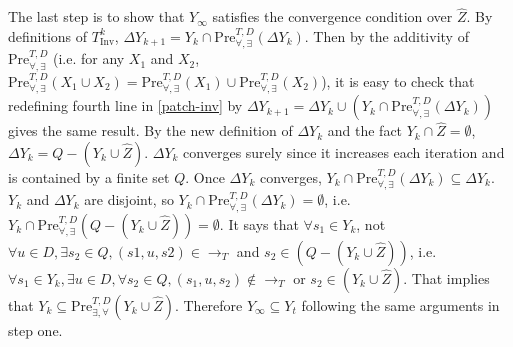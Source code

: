 	The last step is to show that $ Y_{\infty} $ satisfies the convergence condition over $ \widehat{Z} $. By definitions of $ T_{\text{Inv}}^k $, $ \Delta Y_{k+1}= Y_k \cap \text{Pre}_{\forall,\exists}^{T, D}(\Delta Y_k)$. Then by the additivity of $ \text{Pre}^{T,D}_{\forall,\exists} $ (i.e. for any $ X_1 $ and $ X_2 $, $ \text{Pre}_{\forall,\exists}^{T,D} (X_1\cup X_2)=\text{Pre}_{\forall,\exists}^{T,D} (X_1)\cup \text{Pre}_{\forall,\exists}^{T,D} (X_2) $), it is easy to check that redefining fourth line in \eqref{patch-inv} by $ \Delta Y_{k+1} = \Delta Y_k \cup (Y_k \cap \text{Pre}_{\forall,\exists}^{T, D}(\Delta Y_k)) $ gives the same result.  By the new definition of $ \Delta Y_k $ and the fact $ Y_k \cap \widehat{Z} = \emptyset $, $ \Delta Y_k = Q-(Y_k\cup \widehat{Z}) $. $ \Delta Y_k $ converges surely since it increases each iteration and is contained by a finite set $ Q $. Once $ \Delta Y_k $ converges, $ Y_k \cap \text{Pre}_{\forall,\exists}^{T, D}(\Delta Y_k)\subseteq \Delta Y_k $. $ Y_k $ and $ \Delta Y_k $ are disjoint, so $ Y_k \cap \text{Pre}_{\forall,\exists}^{T, D}(\Delta Y_k) = \emptyset $, i.e.  $ Y_k \cap \text{Pre}_{\forall,\exists}^{T, D}(Q-(Y_k\cup \widehat{Z})) = \emptyset $. It says that $ \forall s_1 \in Y_k$, not $\forall u\in D, \exists s_2\in Q, (s1,u,s2)\in \rightarrow_{T} $ and $s_2\in (Q-(Y_k\cup \widehat{Z}))$, i.e. $ \forall s_1 \in Y_k, \exists u\in D, \forall s_2 \in Q,  (s_1,u,s_2)\not\in \rightarrow_{T}$ or $ s_2\in (Y_k\cup \widehat{Z})$. That implies that $ Y_k\subseteq \text{Pre}_{\exists,\forall}^{T,D}(Y_k\cup \widehat{Z}) $. Therefore $ Y_{\infty}\subseteq Y_t $ following the same arguments in step one. \QEDB
\fi